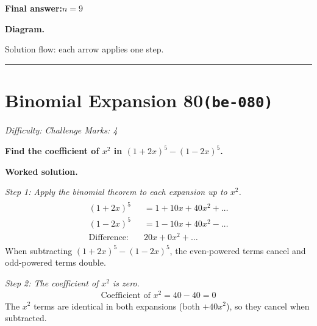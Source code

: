 \documentclass[11pt]{article}
\newcommand{\question}[1]{\par\medskip\noindent\textbf{#1}\par}
\begin{document}
\begin{answerbox}
\textbf{Final answer:}\quad \(\displaystyle n = 9\)
\end{answerbox}
\textbf{Diagram.}

\begin{center}
\end{center}
\small Solution flow: each arrow applies one step.\normalsize

\medskip\hrule

\section*{Binomial Expansion 80\quad\small\texttt{(be-080)}}
\textit{Difficulty: Challenge \quad\textbar\quad Marks: 4}

\question{Find the coefficient of \( x^2 \) in \( (1 + 2x)^5 - (1 - 2x)^5 \).}

\textbf{Worked solution.}

\textit{Step 1: Apply the binomial theorem to each expansion up to \(x^2\).}
\[\begin{gathered}
\begin{aligned} (1+2x)^5 &= 1 + 10x + 40x^2 + \ldots \\ (1-2x)^5 &= 1 - 10x + 40x^2 - \ldots \\ \text{Difference:} \quad &20x + 0x^2 + \ldots \end{aligned}
\end{gathered}\]
When subtracting \((1+2x)^5 - (1-2x)^5\), the even-powered terms cancel and odd-powered terms double.

\textit{Step 2: The coefficient of \(x^2\) is zero.}
\[\begin{gathered}
\text{Coefficient of } x^2 = 40 - 40 = 0
\end{gathered}\]
The \(x^2\) terms are identical in both expansions (both \(+40x^2\)), so they cancel when subtracted.
\end{document}
